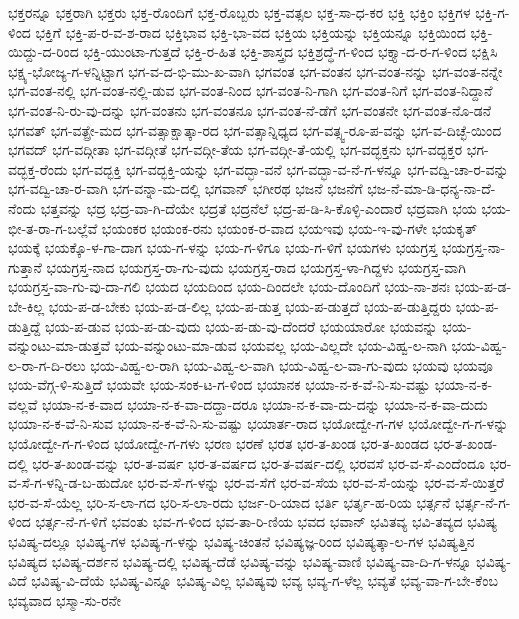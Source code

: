 {ಭಕ್ತರನ್ನೂ
ಭಕ್ತರಾಗಿ
ಭಕ್ತರು
ಭಕ್ತ-ರೊಂದಿಗೆ
ಭಕ್ತ-ರೊಬ್ಬರು
ಭಕ್ತ-ವತ್ಸಲ
ಭಕ್ತ-ಸಾ-ಧ-ಕರ
ಭಕ್ತಿ
ಭಕ್ತಿಂ
ಭಕ್ತಿಗಳ
ಭಕ್ತಿ-ಗ-ಳಿಂದ
ಭಕ್ತಿಗೆ
ಭಕ್ತಿ-ಪ-ರ-ವ-ಶ-ರಾದ
ಭಕ್ತಿಭಾವ
ಭಕ್ತಿ-ಭಾ-ವದ
ಭಕ್ತಿಯ
ಭಕ್ತಿಯನ್ನು
ಭಕ್ತಿಯನ್ನೂ
ಭಕ್ತಿಯಿಂದ
ಭಕ್ತಿ-ಯಿದ್ದು-ದ-ರಿಂದ
ಭಕ್ತಿ-ಯುಂಟಾ-ಗುತ್ತದೆ
ಭಕ್ತಿ-ರ-ಹಿತ
ಭಕ್ತಿ-ಶಾಸ್ತ್ರದ
ಭಕ್ತಿಶ್ರದ್ಧೆ-ಗ-ಳಿಂದ
ಭಕ್ತ್ಯಾ-ದ-ರ-ಗ-ಳಿಂದ
ಭಕ್ಷಿಸಿ
ಭಕ್ಷ್ಯ-ಭೋಜ್ಯ-ಗ-ಳನ್ನಿಟ್ಟಾಗ
ಭಗ-ವ-ದ-ಭಿ-ಮು-ಖ-ವಾಗಿ
ಭಗವಂತ
ಭಗ-ವಂತನ
ಭಗ-ವಂತ-ನನ್ನು
ಭಗ-ವಂತ-ನನ್ನೇ
ಭಗ-ವಂತ-ನಲ್ಲಿ
ಭಗ-ವಂತ-ನಲ್ಲಿ-ಡುವ
ಭಗ-ವಂತ-ನಿಂದ
ಭಗ-ವಂತ-ನಿ-ಗಾಗಿ
ಭಗ-ವಂತ-ನಿಗೆ
ಭಗ-ವಂತ-ನಿದ್ದಾನೆ
ಭಗ-ವಂತ-ನಿ-ರು-ವು-ದನ್ನು
ಭಗ-ವಂತನು
ಭಗ-ವಂತನೂ
ಭಗ-ವಂತ-ನೆ-ಡೆಗೆ
ಭಗ-ವಂತನೇ
ಭಗ-ವಂತ-ನೊ-ಡನೆ
ಭಗವತ್
ಭಗ-ವತ್ಪ್ರೇ-ಮದ
ಭಗ-ವತ್ಸಾಕ್ಷಾತ್ಕಾ-ರದ
ಭಗ-ವತ್ಸಾನ್ನಿಧ್ಯದ
ಭಗ-ವತ್ಸ್ವ-ರೂ-ಪ-ವನ್ನು
ಭಗ-ವ-ದಿಚ್ಛೆ-ಯಿಂದ
ಭಗವದ್
ಭಗ-ವದ್ಗೀತಾ
ಭಗ-ವದ್ಗೀತೆ
ಭಗ-ವದ್ಗೀ-ತೆಯ
ಭಗ-ವದ್ಗೀ-ತೆ-ಯಲ್ಲಿ
ಭಗ-ವದ್ಭಕ್ತನು
ಭಗ-ವದ್ಭಕ್ತರ
ಭಗ-ವದ್ಭಕ್ತ-ರೆಂದು
ಭಗ-ವದ್ಭಕ್ತಿ
ಭಗ-ವದ್ಭಕ್ತಿ-ಯನ್ನು
ಭಗ-ವದ್ಭಾ-ವನೆ
ಭಗ-ವದ್ಭಾ-ವ-ನೆ-ಗ-ಳನ್ನೂ
ಭಗ-ವದ್ವಿ-ಚಾ-ರ-ವನ್ನು
ಭಗ-ವದ್ವಿ-ಚಾ-ರ-ವಾಗಿ
ಭಗ-ವನ್ನಾ-ಮ-ದಲ್ಲಿ
ಭಗವಾನ್
ಭಗೀರಥ
ಭಜನೆ
ಭಜನೆಗೆ
ಭಜ-ನೆ-ಮಾ-ಡಿ-ಧನ್ಯ-ನಾ-ದೆ-ನೆಂದು
ಭತ್ತವನ್ನು
ಭದ್ರ
ಭದ್ರ-ವಾ-ಗಿ-ದೆಯೇ
ಭದ್ರತೆ
ಭದ್ರನೆಲೆ
ಭದ್ರ-ಪ-ಡಿ-ಸಿ-ಕೊಳ್ಳಿ-ಎಂದಾರೆ
ಭದ್ರವಾಗಿ
ಭಯ
ಭಯ-ಭೀ-ತ-ರಾ-ಗ-ಬಲ್ಲೆವೆ
ಭಯಂಕರ
ಭಯಂಕ-ರನು
ಭಯಂಕ-ರ-ವಾದ
ಭಯಇವು
ಭಯ-ಇ-ವು-ಗಳೇ
ಭಯಕೃತ್
ಭಯಕ್ಕೆ
ಭಯಕ್ಕೊ-ಳ-ಗಾ-ದಾಗ
ಭಯ-ಗ-ಳನ್ನು
ಭಯ-ಗ-ಳಿಗೂ
ಭಯ-ಗ-ಳಿಗೆ
ಭಯಗಳು
ಭಯಗ್ರಸ್ತ
ಭಯಗ್ರಸ್ತ-ನಾ-ಗುತ್ತಾನೆ
ಭಯಗ್ರಸ್ತ-ನಾದ
ಭಯಗ್ರಸ್ತ-ರಾ-ಗು-ವುದು
ಭಯಗ್ರಸ್ತ-ರಾದ
ಭಯಗ್ರಸ್ತ-ಳಾ-ಗಿದ್ದಳು
ಭಯಗ್ರಸ್ತ-ವಾಗಿ
ಭಯಗ್ರಸ್ತ-ವಾ-ಗು-ವು-ದಾ-ಗಲಿ
ಭಯದ
ಭಯದಿಂದ
ಭಯ-ದಿಂದಲೇ
ಭಯ-ದೊಂದಿಗೆ
ಭಯ-ನಾ-ಶನಃ
ಭಯ-ಪ-ಡ-ಬೇ-ಕಿಲ್ಲ
ಭಯ-ಪ-ಡ-ಬೇಕು
ಭಯ-ಪ-ಡ-ಲಿಲ್ಲ
ಭಯ-ಪ-ಡುತ್ತ
ಭಯ-ಪ-ಡುತ್ತದೆ
ಭಯ-ಪ-ಡುತ್ತಿದ್ದರು
ಭಯ-ಪ-ಡುತ್ತಿದ್ದೆ
ಭಯ-ಪ-ಡುವ
ಭಯ-ಪ-ಡು-ವುದು
ಭಯ-ಪ-ಡು-ವು-ದೆಂದರೆ
ಭಯಯಾರೋ
ಭಯವನ್ನು
ಭಯ-ವನ್ನುಂಟು-ಮಾ-ಡುತ್ತವೆ
ಭಯ-ವನ್ನುಂಟು-ಮಾ-ಡುವ
ಭಯವಲ್ಲ
ಭಯ-ವಿಲ್ಲದೇ
ಭಯ-ವಿಹ್ವ-ಲ-ನಾಗಿ
ಭಯ-ವಿಹ್ವ-ಲ-ರಾ-ಗ-ದಿ-ರಲು
ಭಯ-ವಿಹ್ವ-ಲ-ರಾಗಿ
ಭಯ-ವಿಹ್ವ-ಲ-ವಾಗಿ
ಭಯ-ವಿಹ್ವ-ಲ-ವಾ-ಗು-ವುದು
ಭಯವು
ಭಯವೂ
ಭಯ-ವೆಗ್ಗ-ಳಿ-ಸುತ್ತಿದೆ
ಭಯವೇ
ಭಯ-ಸಂಕ-ಟ-ಗ-ಳಿಂದ
ಭಯಾನಕ
ಭಯಾ-ನ-ಕ-ವೆ-ನಿ-ಸು-ವಷ್ಟು
ಭಯಾ-ನ-ಕ-ವಲ್ಲವೆ
ಭಯಾ-ನ-ಕ-ವಾದ
ಭಯಾ-ನ-ಕ-ವಾ-ದದ್ದಾ-ದರೂ
ಭಯಾ-ನ-ಕ-ವಾ-ದು-ದನ್ನು
ಭಯಾ-ನ-ಕ-ವಾ-ದುದು
ಭಯಾ-ನ-ಕ-ವೆ-ನಿ-ಸುವ
ಭಯಾ-ನ-ಕ-ವೆ-ನಿ-ಸು-ವಷ್ಟು
ಭಯಾರ್ತ-ರಾದ
ಭಯೋದ್ವೇ-ಗ-ಗಳ
ಭಯೋದ್ವೇ-ಗ-ಗ-ಳನ್ನು
ಭಯೋದ್ವೇ-ಗ-ಗ-ಳಿಂದ
ಭಯೋದ್ವೇ-ಗ-ಗಳು
ಭರಣ
ಭರಣೆ
ಭರತ
ಭರ-ತ-ಖಂಡ
ಭರ-ತ-ಖಂಡದ
ಭರ-ತ-ಖಂಡ-ದಲ್ಲಿ
ಭರ-ತ-ಖಂಡ-ವನ್ನು
ಭರ-ತ-ವರ್ಷ
ಭರ-ತ-ವರ್ಷದ
ಭರ-ತ-ವರ್ಷ-ದಲ್ಲಿ
ಭರವಸೆ
ಭರ-ವ-ಸೆ-ಎಂದೆಂದೂ
ಭರ-ವ-ಸೆ-ಗ-ಳನ್ನಿ-ಡ-ಬ-ಹುದೋ
ಭರ-ವ-ಸೆ-ಗ-ಳನ್ನು
ಭರ-ವ-ಸೆಗೆ
ಭರ-ವ-ಸೆಯ
ಭರ-ವ-ಸೆ-ಯನ್ನು
ಭರ-ವ-ಸೆ-ಯಿತ್ತರೆ
ಭರ-ವ-ಸೆ-ಯೆಲ್ಲ
ಭರಿ-ಸ-ಲಾ-ಗದ
ಭರಿ-ಸ-ಲಾ-ರದು
ಭರ್ಜ-ರಿ-ಯಾದ
ಭರ್ತಿ
ಭರ್ತೃ-ಹ-ರಿಯ
ಭರ್ತ್ಸನೆ
ಭರ್ತ್ಸ-ನೆ-ಗ-ಳಿಂದ
ಭರ್ತ್ಸ-ನೆ-ಗ-ಳಿಗೆ
ಭವಂತು
ಭವ-ಗ-ಳಿಂದ
ಭವ-ತಾ-ರಿ-ಣಿಯ
ಭವದ
ಭವಾನ್
ಭವಿತವ್ಯ
ಭವಿ-ತವ್ಯದ
ಭವಿಷ್ಯ
ಭವಿಷ್ಯ-ದಲ್ಲೂ
ಭವಿಷ್ಯ-ಗಳ
ಭವಿಷ್ಯ-ಗ-ಳನ್ನು
ಭವಿಷ್ಯ-ಚಿಂತನೆ
ಭವಿಷ್ಯಜ್ಞ-ರಿಂದ
ಭವಿಷ್ಯತ್ಕಾ-ಲ-ಗಳ
ಭವಿಷ್ಯತ್ತಿನ
ಭವಿಷ್ಯದ
ಭವಿಷ್ಯ-ದರ್ಶನ
ಭವಿಷ್ಯ-ದಲ್ಲಿ
ಭವಿಷ್ಯ-ದೆಡೆ
ಭವಿಷ್ಯ-ವನ್ನು
ಭವಿಷ್ಯ-ವಾಣಿ
ಭವಿಷ್ಯ-ವಾ-ದಿ-ಗ-ಳನ್ನೂ
ಭವಿಷ್ಯ-ವಿದೆ
ಭವಿಷ್ಯ-ವಿ-ದೆಯೆ
ಭವಿಷ್ಯ-ವಿನ್ನೂ
ಭವಿಷ್ಯ-ವಿಲ್ಲ
ಭವಿಷ್ಯವು
ಭವ್ಯ
ಭವ್ಯ-ಗ-ಳೆಲ್ಲ
ಭವ್ಯತೆ
ಭವ್ಯ-ವಾ-ಗ-ಬೇ-ಕೆಂಬ
ಭವ್ಯವಾದ
ಭಸ್ಮಾ-ಸು-ರನೇ
}
